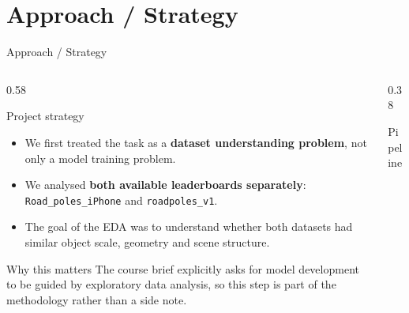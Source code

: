 \documentclass[aspectratio=169]{beamer}
\begin{document}
\section{Approach / Strategy}

\begin{frame}{Approach / Strategy}
  \begin{columns}[T,totalwidth=\textwidth]
    \begin{column}{0.58\textwidth}
      \begin{block}{Project strategy}
        \small
        \begin{itemize}
          \item We first treated the task as a \textbf{dataset understanding problem}, not only a model training problem.
          \item We analysed \textbf{both available leaderboards separately}: \texttt{Road\_poles\_iPhone} and \texttt{roadpoles\_v1}.
          \item The goal of the EDA was to understand whether both datasets had similar object scale, geometry and scene structure.
        \end{itemize}
      \end{block}
      \begin{alertblock}{Why this matters}
        \small
        The course brief explicitly asks for model development to be guided by exploratory data analysis, so this step is part of the methodology rather than a side note.
      \end{alertblock}
    \end{column}
    \begin{column}{0.38\textwidth}
      \begin{block}{Pipeline}
        \small
        \centering
        \vspace{0.3em}
        \vspace{0.3em}
      \end{block}
    \end{column}
  \end{columns}
\end{frame}
\end{document}
